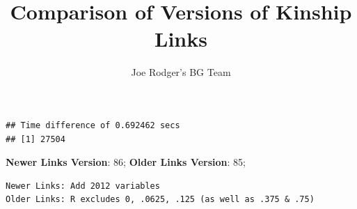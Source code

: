 \documentclass[a4paper]{article}\usepackage[]{graphicx}\usepackage[]{color}
\title{Comparison of Versions of Kinship Links}
\author{Joe Rodger's BG Team}
\makeatletter
\newenvironment{kframe}{%
 \def\at@end@of@kframe{}%
 \ifinner\ifhmode%
  \def\at@end@of@kframe{\end{minipage}}%
  \begin{minipage}{\columnwidth}%
 \fi\fi%
 \def\FrameCommand##1{\hskip\@totalleftmargin \hskip-\fboxsep
 \colorbox{shadecolor}{##1}\hskip-\fboxsep
     \hskip-\linewidth \hskip-\@totalleftmargin \hskip\columnwidth}%
 \MakeFramed {\advance\hsize-\width
   \@totalleftmargin\z@ \linewidth\hsize
   \@setminipage}}%
 {\par\unskip\endMakeFramed%
 \at@end@of@kframe}
\newenvironment{knitrout}{}{} %
\makeatother
\begin{document}
\maketitle

\setlength{\parindent}{0pt}%
















\begin{knitrout}
\color{fgcolor}\begin{kframe}
\begin{verbatim}
## Time difference of 0.692462 secs
## [1] 27504
\end{verbatim}
\end{kframe}
\end{knitrout}



\textbf{Newer Links Version}: 86;
\textbf{Older Links Version}: 85;




\begin{knitrout}
\color{fgcolor}\begin{kframe}
\begin{verbatim}
Newer Links: Add 2012 variables
Older Links: R excludes 0, .0625, .125 (as well as .375 & .75)
\end{verbatim}
\end{kframe}
\end{knitrout}
\end{document}

